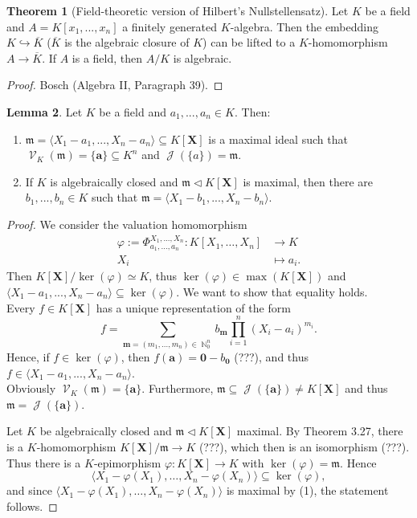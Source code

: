 \documentclass[12pt,a4paper]{report}
\theoremstyle{definition}
\newtheorem{theorem}{Theorem}[chapter] %
\newtheorem{lemma}[theorem]{Lemma}
\theoremstyle{num.custom-title}
\DeclareMathOperator{\J}{\mathcal{J}}
\DeclareMathOperator{\N}{\mathbb{N}}
\DeclareMathOperator{\V}{\mathcal{V}}
\DeclareMathOperator{\sse}{\subseteq}
\newcommand{\ol}{\overline}
\newcommand{\m}{\mathfrak{m}}
\newcommand{\X}{\mathbf{X}}
\renewcommand{\phi}{\varphi}
\begin{document}
\begin{theorem}[Field-theoretic version of Hilbert's Nullstellensatz]
Let $K$ be a field and $A=K[x_1,...,x_n]$ a finitely generated $K$-algebra. Then the embedding $K \hookrightarrow \ol{K}$ ($\ol{K}$ is the algebraic closure of $K$) can be lifted to a $K$-homomorphism $A \to \ol{K}$. If $A$ is a field, then $A/K$ is algebraic.
\begin{proof}
Bosch (Algebra II, Paragraph 39).
\end{proof}
\end{theorem}

\begin{lemma}
Let $K$ be a field and $a_1,...,a_n \in K$. Then:
\begin{enumerate}
\item $\m = \langle X_1-a_1, ..., X_n-a_n \rangle \sse K[\X]$ is a maximal ideal such that $\V_K(\m) = \{\mathbf{a}\} \sse K^n$ and $\J(\{a\})=\m$.
\item If $K$ is algebraically closed and $\m \lhd K[\X]$ is maximal, then there are $b_1,...,b_n \in K$ such that $\m = \langle X_1-b_1, ..., X_n-b_n \rangle$.
\end{enumerate}
\begin{proof}
We consider the valuation homomorphism
\begin{align*}
\phi:= \Phi_{a_1,\ldots,a_n}^{X_1,...,X_n} \colon K[X_1,\ldots,X_n] & \to K \\
X_i & \mapsto a_i.
\end{align*}
Then $K[\X]/\ker(\phi) \simeq K$, thus $\ker(\phi) \in \max(K[\X])$ and $\langle X_1-a_1,...,X_n-a_n \rangle \sse \ker(\phi)$. We want to show that equality holds.\\
Every $f \in K[\X]$ has a unique representation of the form
\[
f = \sum_{\mathbf{m}=(m_1,\ldots,m_n) \in \N_0^n} b_\mathbf{m} \prod_{i=1}^n (X_i-a_i)^{m_i}. \tag{Taylor series}
\]
Hence, if $f \in \ker(\phi)$, then $f(\mathbf{a}) = \mathbf{0} - b_\mathbf{0}$ (???), and thus $f \in \langle X_1-a_1,...,X_n-a_n \rangle$.\\
Obviously $\V_K(\m) = \{\mathbf{a}\}$. Furthermore, $\m \sse \J(\{\mathbf{a}\}) \neq K[\X]$ and thus $\m=\J(\{\mathbf{a}\})$.
\item Let $K$ be algebraically closed and $\m \lhd K[\X]$ maximal. By Theorem 3.27, there is a $K$-homomorphism $K[\X]/\m \to K$ (???), which then is an isomorphism (???). Thus there is a $K$-epimorphism $\phi: K[\X] \to K$ with $\ker(\phi) = \m$. Hence
\[
\langle X_1 - \phi(X_1), \ldots, X_n - \phi(X_n) \rangle \sse \ker(\phi),
\]
and since $\langle X_1 - \phi(X_1), \ldots , X_n - \phi(X_n) \rangle$ is maximal by (1), the statement follows.
\end{proof}
\end{lemma}
\end{document}
